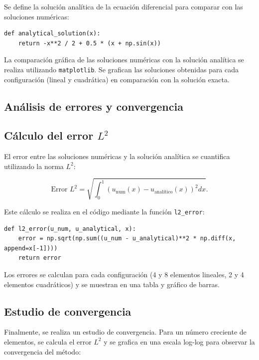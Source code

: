 Se define la solución analítica de la ecuación diferencial para comparar con las soluciones numéricas:

\begin{verbatim}
def analytical_solution(x):
    return -x**2 / 2 + 0.5 * (x + np.sin(x))
\end{verbatim}

La comparación gráfica de las soluciones numéricas con la solución analítica se realiza utilizando \texttt{matplotlib}. Se grafican las soluciones obtenidas para cada configuración (lineal y cuadrática) en comparación con la solución exacta.

\subsection{Análisis de errores y convergencia}

\subsection{Cálculo del error \( L^2 \)}

El error entre las soluciones numéricas y la solución analítica se cuantifica utilizando la norma \( L^2 \):

\begin{equation}
\text{Error } L^2 = \sqrt{\int_0^1 \left( u_{\text{num}}(x) - u_{\text{analítico}}(x) \right)^2 dx}.
\end{equation}

Este cálculo se realiza en el código mediante la función \texttt{l2\_error}:

\begin{verbatim}
def l2_error(u_num, u_analytical, x):
    error = np.sqrt(np.sum((u_num - u_analytical)**2 * np.diff(x, append=x[-1])))
    return error
\end{verbatim}

Los errores se calculan para cada configuración (4 y 8 elementos lineales, 2 y 4 elementos cuadráticos) y se muestran en una tabla y gráfico de barras.

\subsection{Estudio de convergencia}

Finalmente, se realiza un estudio de convergencia. Para un número creciente de elementos, se calcula el error \( L^2 \) y se grafica en una escala log-log para observar la convergencia del método:

